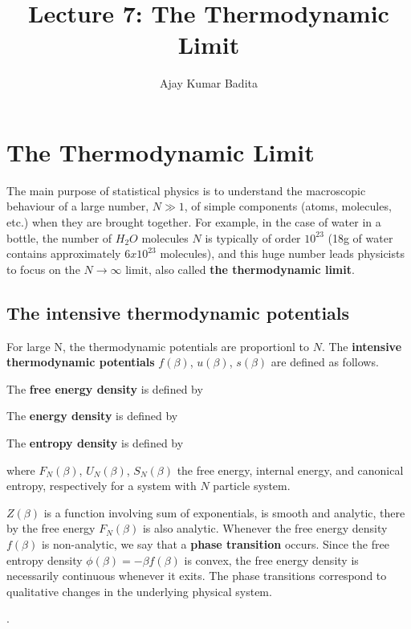 \documentclass[letterpaper,english,12pt]{article}
\title{Lecture 7: The Thermodynamic Limit}
\author{Ajay Kumar Badita}
\begin{document}
\maketitle
\section{The Thermodynamic Limit}
The main purpose of statistical physics is to understand the macroscopic behaviour of a large number, $N\gg1$, of simple components (atoms, molecules, etc.) when they are brought together.
For example, in the case of water in a bottle, the number of $H_2 O$ molecules $N$ is typically of order $10^{23}$ (18g of water contains approximately $6x10^{23}$ molecules), and this huge number leads physicists to focus on the $N \rightarrow \infty$ limit, also called \textbf{the thermodynamic limit}.

\subsection{The intensive thermodynamic potentials}
For large N, the thermodynamic potentials are proportionl to $N$. The \textbf{intensive thermodynamic potentials} $f (\beta)$, $u (\beta)$, $s (\beta)$ are defined as follows.

\begin{defn}
The \textbf{free energy density} is defined by 
\end{defn}

\begin{defn}
The \textbf{energy density} is defined by 
\end{defn}

\begin{defn}
The \textbf{entropy density} is defined by 
\end{defn}

where $F_N (\beta)$, $U_N (\beta)$, $S_N (\beta)$ the free energy, internal energy, and canonical entropy, respectively for a system with $N$  particle system.

\begin{defn}
$Z (\beta)$ is a function involving sum of exponentials, is smooth and analytic, there by the free energy $F_N (\beta)$ is also analytic.
Whenever the free energy density $f (\beta)$ is non-analytic, we say that a \textbf{phase transition} occurs.
Since the free entropy density $\phi (\beta) = -\beta f(\beta)$ is convex, the free energy density is necessarily continuous whenever it exits.
The phase transitions correspond to qualitative changes in the underlying physical system.
\end{defn}.  
\end{document}
